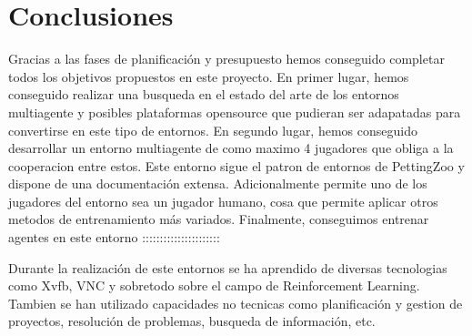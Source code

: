 \section{Conclusiones}

Gracias a las fases de planificación y presupuesto hemos conseguido completar todos los objetivos propuestos en este proyecto. En primer lugar, hemos conseguido realizar una busqueda en el estado del arte de los entornos multiagente y posibles plataformas opensource que pudieran ser adapatadas para convertirse en este tipo de entornos. En segundo lugar, hemos conseguido desarrollar un entorno multiagente de como maximo 4 jugadores que obliga a la cooperacion entre estos. Este entorno sigue el patron de entornos de PettingZoo y dispone de una documentación extensa. Adicionalmente permite uno de los jugadores del entorno sea un jugador humano, cosa que permite aplicar otros metodos de entrenamiento más variados. Finalmente, conseguimos entrenar agentes en este entorno ::::::::::::::::::::::


Durante la realización de este entornos se ha aprendido de diversas tecnologias como Xvfb, VNC y sobretodo sobre el campo de Reinforcement Learning. Tambien se han utilizado capacidades no tecnicas como planificación y gestion de proyectos, resolución de problemas, busqueda de información, etc.